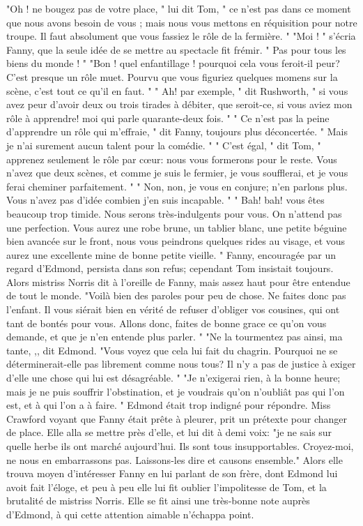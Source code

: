 "Oh ! ne bougez pas de votre place, " lui dit Tom, " ce n'est pas dans ce moment que nous avons besoin de vous ; mais nous vous mettons en réquisition pour notre troupe. Il faut absolument que vous fassiez le rôle de la fermière. "
"Moi ! " s'écria Fanny, que la seule idée de se mettre au spectacle fit frémir. " Pas pour tous les biens du monde ! "
"Bon ! quel enfantillage ! pourquoi cela\setcounter{page}{116} vous feroit-il peur? C'est presque un rôle muet. Pourvu que vous figuriez quelques momens sur la scène, c'est tout ce qu'il en faut. "
" Ah! par exemple, " dit Rushworth, " si vous avez peur d'avoir deux ou trois tirades à débiter, que seroit-ce, si vous aviez mon rôle à apprendre! moi qui parle quarante-deux fois. "
" Ce n'est pas la peine d'apprendre un rôle qui m'effraie, " dit Fanny, toujours plus déconcertée. " Mais je n'ai surement aucun talent pour la comédie. "
" C'est égal, " dit Tom, " apprenez seulement le rôle par cœur: nous vous formerons pour le reste. Vous n'avez que deux scènes, et comme je suis le fermier, je vous soufflerai, et je vous ferai cheminer parfaitement. "
" Non, non, je vous en conjure; n'en parlons plus. Vous n'avez pas d'idée combien j'en suis incapable. "
" Bah! bah! vous êtes beaucoup trop timide. Nous serons très-indulgents pour vous. On n'attend pas une perfection. Vous aurez une robe brune, un tablier blanc, une petite béguine bien avancée sur le front, nous vous peindrons quelques rides au visage, et\setcounter{page}{117} vous aurez une excellente mine de bonne petite vieille. "
Fanny, encouragée par un regard d'Edmond, persista dans son refus; cependant Tom insistait toujours. Alors mistriss Norris dit à l'oreille de Fanny, mais assez haut pour être entendue de tout le monde.
"Voilà bien des paroles pour peu de chose. Ne faites donc pas l'enfant. Il vous siérait bien en vérité de refuser d'obliger vos cousines, qui ont tant de bontés pour vous. Allons donc, faites de bonne grace ce qu'on vous demande, et que je n'en entende plus parler. "
"Ne la tourmentez pas ainsi, ma tante, ,, dit Edmond. "Vous voyez que cela lui fait du chagrin. Pourquoi ne se déterminerait-elle pas librement comme nous tous? Il n'y a pas de justice à exiger d'elle une chose qui lui est désagréable. "
"Je n'exigerai rien, à la bonne heure; mais je ne puis souffrir l'obstination, et je voudrais qu'on n'oubliât pas qui l'on est, et à qui l'on a à faire. "
Edmond était trop indigné pour répondre. Miss Crawford voyant que Fanny était prête à pleurer, prit un prétexte pour changer de place. Elle alla se mettre près d'elle, et lui dit à demi voix: "je ne sais sur quelle herbe\setcounter{page}{118} ils ont marché aujourd'hui. Ils sont tous insupportables. Croyez-moi, ne nous en embarrassons pas. Laissons-les dire et causons ensemble." Alors elle trouva moyen d'intéresser Fanny en lui parlant de son frère, dont Edmond lui avoit fait l'éloge, et peu à peu elle lui fit oublier l'impolitesse de Tom, et la brutalité de mistriss Norris. Elle se fit ainsi une très-bonne note auprès d'Edmond, à qui cette attention aimable n'échappa point.
